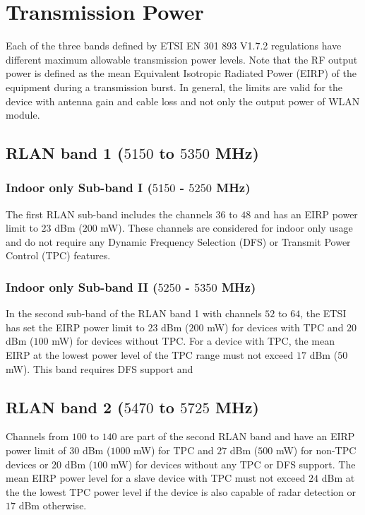 \section{Transmission Power}

Each of the three bands defined by ETSI EN 301 893 V1.7.2 regulations \cite{LBT-ETSI-2014} have different maximum allowable transmission power levels. Note that the RF output power is defined as the mean Equivalent Isotropic Radiated Power (EIRP) of the equipment during a transmission burst. In general, the limits are valid for the device with antenna gain and cable loss and not only the output power of WLAN module.

\subsection{RLAN band 1 ($5150$ to $5350$ MHz)}

\subsubsection{Indoor only Sub-band I ($5150$ - $5250$ MHz)}
The first RLAN sub-band includes the channels $36$ to $48$ and has an EIRP power limit to $23$ dBm ($200$ mW). These channels are considered for indoor only usage and do not require any Dynamic Frequency Selection (DFS) or Transmit Power Control (TPC) features. 

\subsubsection{Indoor only Sub-band II ($5250$ - $5350$ MHz)}
In the second sub-band of the RLAN band 1 with channels $52$ to $64$, the ETSI has set the EIRP power limit to $23$ dBm ($200$ mW) for devices with TPC and $20$ dBm ($100$ mW) for devices without TPC. For a device with TPC, the mean EIRP at the lowest power level of the TPC range must not exceed $17$ dBm ($50$ mW). This band requires DFS support and 

\subsection{RLAN band 2 ($5470$ to $5725$ MHz)}

Channels from $100$ to $140$ are part of the second RLAN band and have an EIRP power limit of $30$ dBm ($1000$ mW) for TPC and $27$ dBm ($500$ mW) for non-TPC devices or $20$ dBm ($100$ mW) for devices without any TPC or DFS support. The mean EIRP power level for a slave device with TPC must not exceed $24$ dBm at the the lowest TPC power level if the device is also capable of radar detection or $17$ dBm otherwise. 

